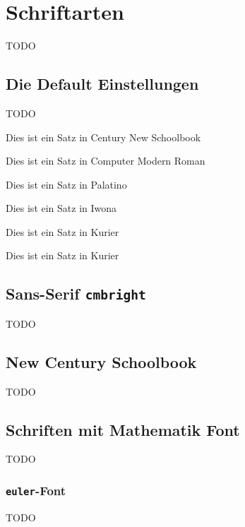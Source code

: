
\chapter{Schriftarten}
TODO

\section{Die Default Einstellungen}
TODO

Dies ist ein Satz in Century New Schoolbook

{\selectfont Dies ist ein Satz in Computer Modern Roman}

{\selectfont Dies ist ein Satz in Palatino}

{\selectfont Dies ist ein Satz in Iwona}

{\selectfont Dies ist ein Satz in Kurier}

{\selectfont Dies ist ein Satz in Kurier}



\section{Sans-Serif \texttt{cmbright}}
TODO



\section{New Century Schoolbook}

TODO


\section{Schriften mit Mathematik Font}
TODO

\subsection{\texttt{euler}-Font}

TODO
